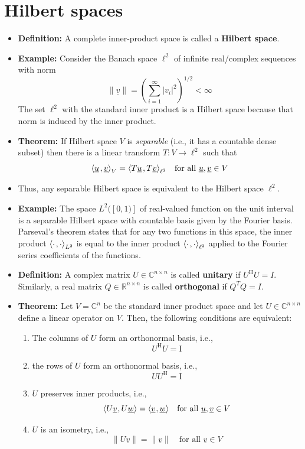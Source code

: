\documentclass[11pt,twoside]{report}
\newcommand{\bbR}{{\mathbb{R}}}
\newcommand{\bbC}{{\mathbb{C}}}
\newcommand{\vecnot}{\underline}
\newcommand{\Id}{{\mathrm{I}}}
\newcommand{\Herm}{{\mathrm{H}}}
\newcommand{\inner}[2]{{\left\langle #1 \mskip2mu , #2 \right\rangle}}
\newcommand{\tinner}[2]{{\langle #1 \mskip1mu , #2 \rangle}}
\begin{document}
\section{Hilbert spaces} 
\begin{itemize} 

\item \textbf{Definition:}  A complete inner-product space is called a \textbf{Hilbert space}.


\item \textbf{Example:} 
Consider the Banach space $\ell^2$ of infinite real/complex sequences with norm 
\[
\|\vecnot{v}\| = \left( \sum_{i=1}^\infty |v_i|^2 \right)^{1/2} < \infty
\]
The set $\ell^2$ with the standard inner product is a Hilbert space  because that norm is induced by the inner product.



\item \textbf{Theorem:} 
If Hilbert space $V$  is \emph{separable} (i.e., it has a countable dense subset) then there is a linear transform $T:V\to \ell^2$ such that 
\[
\inner{ \vecnot{u} }{ \vecnot{v} }_V = \inner{ T\vecnot{u} }{ T\vecnot{v} }_{\ell^2} \quad \text{for all $\vecnot{u},\vecnot{v} \in V$}
\]

\item Thus, any separable Hilbert space is equivalent to the Hilbert space $\ell^2$.


\item \textbf{Example:} The space $L^2([0,1)]$ of real-valued function on the unit interval is a separable Hilbert space with countable basis given by the Fourier basis. Parseval's theorem states that for any two functions in this space,  the inner product $\inner{\cdot}{\cdot}_{L^2}$ is equal to the inner product $\inner{ \cdot }{ \cdot}_{\ell^2}$ applied to the Fourier series coefficients of the functions. 



\item \textbf{Definition:}  
A complex matrix $U\in \bbC^{n\times n}$ is called \textbf{unitary} if $U^\Herm U = I$.
Similarly, a real matrix $Q\in \bbR^{n\times n}$ is called \textbf{orthogonal} if $Q^T Q = I$.



\item \textbf{Theorem:}  
Let $V =\bbC^n$ be the standard inner product space and let  $U\in \bbC^{n\times n}$ define a linear operator on $V$.
Then, the following conditions are equivalent:
\begin{enumerate}
\item[(i)] The columns of $U$ form an orthonormal basis, i.e.,  
\[
U^\Herm U = \Id
\]
\item[(ii)] the rows of $U$ form an orthonormal basis, i.e., 
\[
U U^\Herm = \Id
\]
\item[(iii)] $U$ preserves inner products, i.e., 
\[
\tinner{ U \vecnot{v} }{ U \vecnot{w} } = \tinner{ \vecnot{v} }{ \vecnot{w} } \quad \text{for all $\vecnot{u},\vecnot{v}\in V$}
\]
\item[(iv)] $U$ is an isometry, i.e., 
\[
\| U \vecnot{v} \| = \| \vecnot{v}\| \quad \text{for all $\vecnot{v} \in V$}
\]
\end{enumerate}




\end{itemize}
\end{document}
